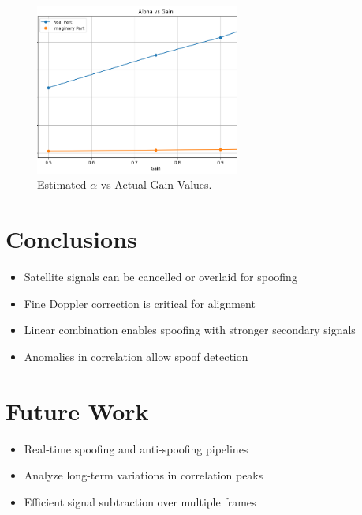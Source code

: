 \documentclass[12pt]{report}
\begin{document}
\begin{figure}[H]
  \centering
  \includegraphics[width=0.6\textwidth]{alpvsgain.png}
  \caption{Estimated $\alpha$ vs Actual Gain Values.}
  \label{fig:alpvsgain}
\end{figure}

\section{Conclusions}
\begin{itemize}
  \item Satellite signals can be cancelled or overlaid for spoofing
  \item Fine Doppler correction is critical for alignment
  \item Linear combination enables spoofing with stronger secondary signals
  \item Anomalies in correlation allow spoof detection
\end{itemize}

\section{Future Work}
\begin{itemize}
  \item Real-time spoofing and anti-spoofing pipelines
  \item Analyze long-term variations in correlation peaks
  \item Efficient signal subtraction over multiple frames
\end{itemize}
\end{document}
